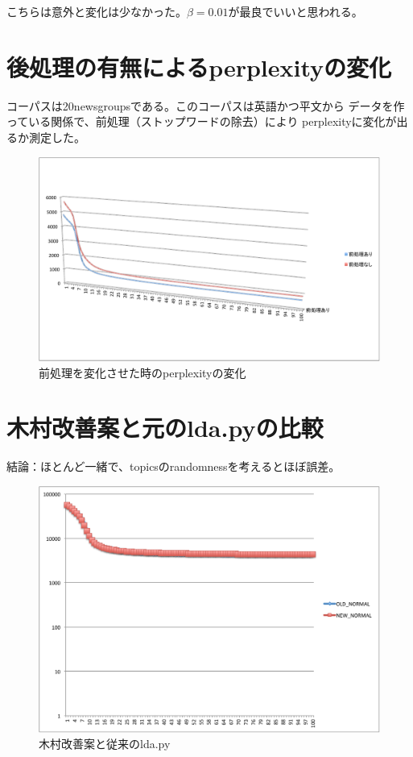 \documentclass[uplatex,dvipdfmx]{jsarticle}
\begin{document}
こちらは意外と変化は少なかった。$\beta=0.01$が最良でいいと思われる。

\section{後処理の有無によるperplexityの変化}
コーパスは20newsgroupsである。このコーパスは英語かつ平文から
データを作っている関係で、前処理（ストップワードの除去）により
perplexityに変化が出るか測定した。

\begin{figure}[htb]
\includegraphics[width=16cm,pagebox=cropbox]{20newspre.pdf}
\caption{前処理を変化させた時のperplexityの変化}
\end{figure}

\section{木村改善案と元のlda.pyの比較}

結論：ほとんど一緒で、topicsのrandomnessを考えるとほぼ誤差。

\begin{figure}[htb]
\includegraphics[width=16cm,pagebox=cropbox]{oldandnewnoncool.pdf}
\caption{木村改善案と従来のlda.py}
\end{figure}
\end{document}
